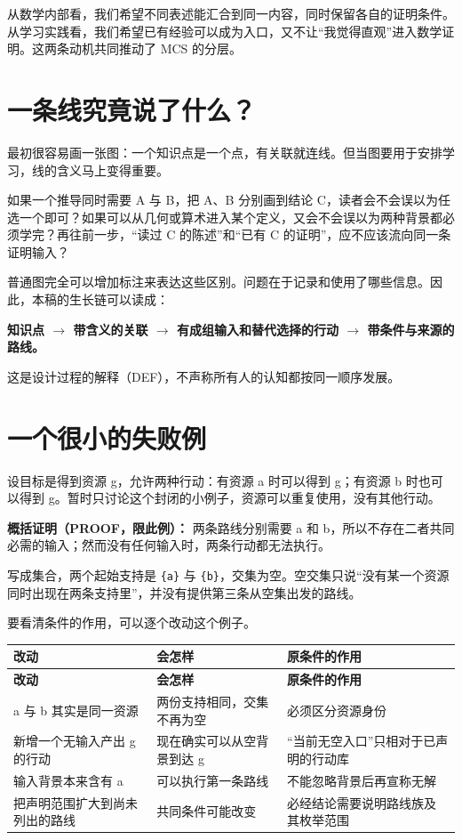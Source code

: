 \documentclass[UTF8,a4paper,zihao=-4,fontset=windows,openany]{ctexbook}
\begin{document}
从数学内部看，我们希望不同表述能汇合到同一内容，同时保留各自的证明条件。从学习实践看，我们希望已有经验可以成为入口，又不让“我觉得直观”进入数学证明。这两条动机共同推动了 MCS 的分层。

\section{一条线究竟说了什么？}
最初很容易画一张图：一个知识点是一个点，有关联就连线。但当图要用于安排学习，线的含义马上变得重要。

如果一个推导同时需要 A 与 B，把 A、B 分别画到结论 C，读者会不会误以为任选一个即可？如果可以从几何或算术进入某个定义，又会不会误以为两种背景都必须学完？再往前一步，“读过 C 的陈述”和“已有 C 的证明”，应不应该流向同一条证明输入？

普通图完全可以增加标注来表达这些区别。问题在于记录和使用了哪些信息。因此，本稿的生长链可以读成：

\textbf{知识点 \(\to\) 带含义的关联 \(\to\) 有成组输入和替代选择的行动 \(\to\) 带条件与来源的路线。}

这是设计过程的解释（DEF），不声称所有人的认知都按同一顺序发展。

\section{一个很小的失败例}
设目标是得到资源 g，允许两种行动：有资源 a 时可以得到 g；有资源 b 时也可以得到 g。暂时只讨论这个封闭的小例子，资源可以重复使用，没有其他行动。

\textbf{概括证明（PROOF，限此例）：} 两条路线分别需要 a 和 b，所以不存在二者共同必需的输入；然而没有任何输入时，两条行动都无法执行。

写成集合，两个起始支持是 \texttt{\{a\}} 与 \texttt{\{b\}}，交集为空。空交集只说“没有某一个资源同时出现在两条支持里”，并没有提供第三条从空集出发的路线。

要看清条件的作用，可以逐个改动这个例子。

\begingroup\small\setlength{\tabcolsep}{4pt}
\begin{longtable}{>{\raggedright\arraybackslash}p{}>{\raggedright\arraybackslash}p{}>{\raggedright\arraybackslash}p{}}
\toprule
\textbf{改动} & \textbf{会怎样} & \textbf{原条件的作用} \\
\midrule
\endfirsthead
\toprule
\textbf{改动} & \textbf{会怎样} & \textbf{原条件的作用} \\
\midrule
\endhead
\bottomrule
\endfoot
\bottomrule
\endlastfoot
a 与 b 其实是同一资源 & 两份支持相同，交集不再为空 & 必须区分资源身份 \\
新增一个无输入产出 g 的行动 & 现在确实可以从空背景到达 g & “当前无空入口”只相对于已声明的行动库 \\
输入背景本来含有 a & 可以执行第一条路线 & 不能忽略背景后再宣称无解 \\
把声明范围扩大到尚未列出的路线 & 共同条件可能改变 & 必经结论需要说明路线族及其枚举范围 \\
\end{longtable}
\endgroup
\end{document}
